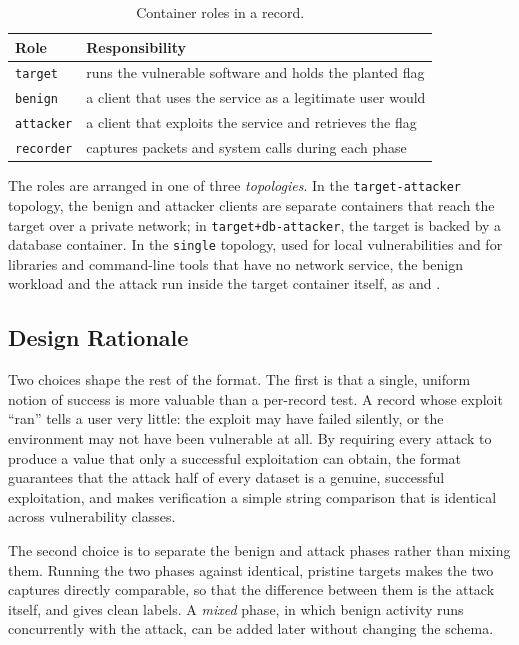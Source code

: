 \begin{table}[t]
\centering
\caption{Container roles in a \cvexthree record.}
\label{tab:roles}
\small
\begin{tabular}{@{}lp{}@{}}
\toprule
\textbf{Role} & \textbf{Responsibility} \\
\midrule
\texttt{target} & runs the vulnerable software and holds the planted flag \\
\texttt{benign} & a client that uses the service as a legitimate user would \\
\texttt{attacker} & a client that exploits the service and retrieves the flag \\
\texttt{recorder} & captures packets and system calls during each phase \\
\bottomrule
\end{tabular}
\end{table}

The roles are arranged in one of three \emph{topologies}. In the
\texttt{target-attacker} topology, the benign and attacker clients are
separate containers that reach the target over a private network; in
\texttt{target+db-attacker}, the target is backed by a database container.
In the \texttt{single} topology, used for local vulnerabilities and for
libraries and command-line tools that have no network service, the benign
workload and the attack run inside the target container itself, as
 and .

\subsection{Design Rationale}

Two choices shape the rest of the format. The first is that a single, uniform
notion of success is more valuable than a per-record test. A record whose
exploit ``ran'' tells a user very little: the exploit may have failed
silently, or the environment may not have been vulnerable at all. By
requiring every attack to produce a value that only a successful
exploitation can obtain, the format guarantees that the attack half of every
dataset is a genuine, successful exploitation, and makes verification a
simple string comparison that is identical across vulnerability classes.

The second choice is to separate the benign and attack phases rather than
mixing them. Running the two phases against identical, pristine targets
makes the two captures directly comparable, so that the difference between
them is the attack itself, and gives clean labels. A \emph{mixed} phase, in
which benign activity runs concurrently with the attack, can be added later
without changing the schema.

